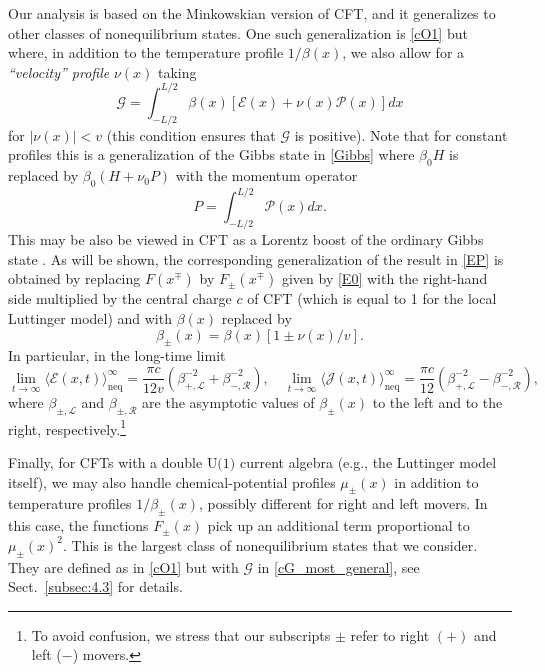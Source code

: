 \documentclass[12pt,a4paper]{article}
\newcommand{\cE}{\mathcal{E}}
\newcommand{\cG}{\mathcal{G}}
\newcommand{\cJ}{\mathcal{J}}
\newcommand{\cL}{\mathcal{L}}
\newcommand{\cP}{\mathcal{P}}
\newcommand{\cR}{\mathcal{R}}
\theoremstyle{definition}
\theoremstyle{remark}
\begin{document}
Our analysis is based on the Minkowskian version of CFT, and it
generalizes to other classes of nonequilibrium states.
One such generalization is \eqref{cO1} but where, in addition to
the temperature profile $1/\beta(x)$, we also allow for a
{\it ``velocity'' profile} $\nu(x)$ taking
%
\begin{equation} 
\label{cG2} 
\cG = \int_{-L/2}^{L/2} \beta(x) \left[ \cE(x) + \nu(x)\cP(x) \right] dx
\end{equation} 
%
for $|\nu(x)| < v$ (this condition ensures that $\cG$ is positive).
Note that for constant profiles this is a generalization \cite{Callen} of the Gibbs state in \eqref{Gibbs} where $\beta_0H$ is replaced by $\beta_0(H+\nu_0 P)$ with the momentum operator 
%
\begin{equation} 
P = \int_{-L/2}^{L/2} \cP(x) dx.
\end{equation} 
%
This may be also be viewed in CFT as a Lorentz boost of the ordinary Gibbs state \cite{BeDo3}.
As will be shown, the corresponding generalization of the result in \eqref{EP} is obtained by replacing $F(x^\mp)$ by $F_{\pm}(x^\mp)$ given by \eqref{E0} with the right-hand side multiplied by the central charge $c$ of CFT (which is equal to 1 for the local Luttinger model) and with $\beta(x)$ replaced by
%
\begin{equation} 
\label{F2} 
\beta_{\pm}(x) = \beta(x)[1 \pm \nu(x)/v].  
\end{equation} 
%
In particular, in the long-time limit
%
\begin{equation}
\label{15}
\lim_{t\to\infty}\langle \cE(x,t) \rangle^\infty_{\text{neq}}
= \frac{\pi c}{12v} \left( \beta_{+,\cL}^{-2}+\beta_{-,\cR}^{-2} \right),
\quad
\lim_{t\to\infty}\langle \cJ(x,t) \rangle^\infty_{\text{neq}}
= \frac{\pi c}{12} \left( \beta_{+,\cL}^{-2} - \beta_{-,\cR}^{-2} \right),
\end{equation}
%
where $\beta_{\pm,\cL}$ and $\beta_{\pm,\cR}$ are the asymptotic values of $\beta_{\pm}(x)$ to the left and to the right, respectively.\footnote{To avoid confusion, we stress that our subscripts $\pm$ refer
to right $(+)$ and left ($-$) movers.}

Finally, for CFTs with a double $\text{U(1)}$ current algebra (e.g., the Luttinger model itself), we may also handle chemical-potential profiles $\mu_{\pm}(x)$ in addition to temperature profiles $1/\beta_{\pm}(x)$, possibly different for right and left movers.
In this case, the functions $F_{\pm}(x)$ pick up an additional term proportional to $\mu_{\pm}(x)^2$.
This is the largest class of nonequilibrium states that we consider. They are defined as in 
\eqref{cO1} but with $\cG$ in \eqref{cG_most_general}, see Sect.~\ref{subsec:4.3} 
for details.
\end{document}
